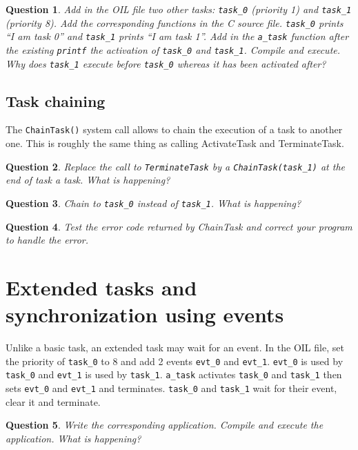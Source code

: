 \documentclass[11pt]{article}
\newtheorem{ex}{Question}
\begin{document}
\begin{ex}
Add in the OIL file two other tasks: \texttt{task_0} (priority 1) and \texttt{task_1} (priority 8). Add the corresponding functions in the C source file. \texttt{task_0} prints ``I am task 0'' and \texttt{task_1} prints ``I am task 1''. Add in the \texttt{a_task} function after the existing \texttt{printf} the activation of \texttt{task_0} and \texttt{task_1}. Compile and execute. Why does \texttt{task_1} execute before \texttt{task_0} whereas it has been activated after?
\end{ex}

\subsection{Task chaining}

The \texttt{ChainTask()} system call allows to chain the execution of a task to another one. This is roughly the same thing as calling ActivateTask and TerminateTask.

\begin{ex}
Replace the call to \texttt{TerminateTask} by a \texttt{ChainTask(task_1)} at the end of task a task. What is happening?
\end{ex}

\begin{ex}
Chain to \texttt{task_0} instead of \texttt{task_1}. What is happening?
\end{ex}

\begin{ex}
Test the error code returned by ChainTask and correct your program to
handle the error.
\end{ex}

\section{Extended tasks and synchronization using events}

Unlike a basic task, an extended task may wait for an event. In the OIL file, set the priority of \texttt{task_0} to 8 and add 2 events \texttt{evt_0} and \texttt{evt_1}. \texttt{evt_0} is used by \texttt{task_0} and \texttt{evt_1} is used by \texttt{task_1}. \texttt{a_task} activates \texttt{task_0} and \texttt{task_1} then sets \texttt{evt_0} and \texttt{evt_1} and terminates. \texttt{task_0} and \texttt{task_1} wait for their event, clear it and terminate.

\begin{ex}
Write the corresponding application. Compile and execute the application. What is happening?
\end{ex}
\end{document}
